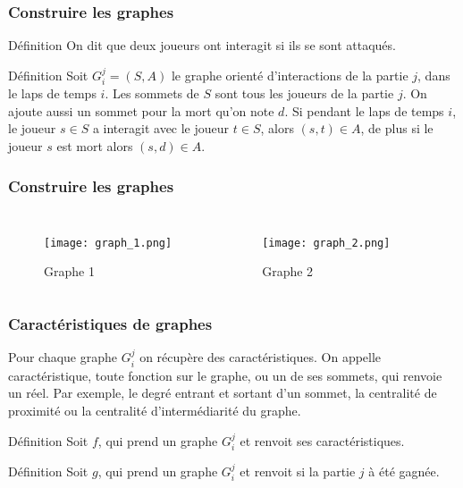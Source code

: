 \documentclass{beamer}
\begin{document}
\begin{frame}
    \frametitle{Construire les graphes}
    \begin{block}{Définition}
        On dit que deux joueurs ont interagit si ils se sont attaqués. 
    \end{block}
    \begin{block}{Définition}
        Soit $G_{i}^{j} = (S, A)$ le graphe orienté d'interactions de la partie $j$, dans le laps de temps $i$. \newline\newline
        Les sommets de $S$ sont tous les joueurs de la partie $j$. On ajoute aussi un sommet pour la mort qu'on note $d$. \newline\newline
        Si pendant le laps de temps $i$, le joueur $s \in S$ a interagit avec le joueur $t \in S$, alors $(s, t) \in A$, de plus si le joueur $s$ est mort alors $(s, d) \in A$.
    \end{block}
\end{frame}

\begin{frame}
    \frametitle{Construire les graphes}
    \begin{columns}
        \begin{figure}
            \centering
            \texttt{[image: graph\_1.png]}
            \caption{Graphe 1}
        \end{figure}
        \begin{figure}
            \centering
            \texttt{[image: graph\_2.png]}
            \caption{Graphe 2}
        \end{figure}        
        \end{columns}
\end{frame}

\begin{frame}
    \frametitle{Caractéristiques de graphes}\small
    Pour chaque graphe $G_{i}^{j}$ on récupère des caractéristiques. \newline \newline
    On appelle caractéristique, toute fonction sur le graphe, ou un de ses sommets, qui renvoie un réel. Par exemple, le degré entrant et sortant d'un sommet, la centralité de proximité ou la centralité d'intermédiarité du graphe. \newline
    \begin{block}{Définition}
        Soit $f$, qui prend un graphe $G_{i}^{j}$ et renvoit ses caractéristiques.
    \end{block}
    \begin{block}{Définition}
        Soit $g$, qui prend un graphe $G_{i}^{j}$ et renvoit si la partie $j$ à été gagnée.
    \end{block}
\end{frame}
\end{document}
